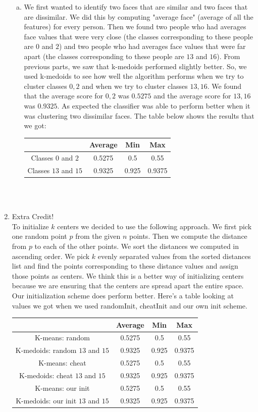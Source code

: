 \documentclass[11pt]{article}
\begin{document}
\begin{enumerate}[1]
\begin{enumerate}[(a)]
\item We first wanted to identify two faces that are similar and two faces that are dissimilar. We did this by computing "average face" (average of all the features) for every person. Then we found two people who had averages face values that were very close (the classes corresponding to these people are $0$ and $2$) and two people who had averages face values that were far apart (the classes corresponding to these people are $13$ and $16$). From previous parts, we saw that k-medoids performed slightly better. So, we used k-medoids to see how well the algorithm performs when we try to cluster classes $0,2$ and when we try to cluster classes $13,16$. We found that the average score for $0,2$ was $0.5275$ and the average score for $13, 16$ was $0.9325$. As expected the classifier was able to perform better when it was clustering two dissimilar faces.  The table below shows the results that we got: \\
 \begin{tabular}{| c | c | c | c |}
  \hline		
   & Average & Min & Max \\
  \hline
  Classes $0$ and $2$ & 0.5275 & 0.5 & 0.55 \\
  Classes $13$ and $15$ & 0.9325 & 0.925 & 0.9375   \\
  \hline
\end{tabular}\\ \\
\end{enumerate}
\item Extra Credit! \\
To initialize $k$ centers we decided to use the following approach. We first pick one random point $p$ from the given $n$ points. Then we compute the distance from $p$ to each of the other points. We sort the distances we computed in ascending order. We pick $k$ evenly separated values from the sorted distances list and find the points corresponding to these distance values and assign those points as centers. We think this is a better way of initializing centers because we are ensuring that the centers are spread apart the entire space. \\
Our initialization scheme does perform better. Here's a table looking at values we got when we used randomInit, cheatInit and our own init scheme. \\
 \begin{tabular}{| c | c | c | c |}
  \hline		
   & Average & Min & Max \\
  \hline
  K-means: random & 0.5275 & 0.5 & 0.55 \\
  K-medoids: random $13$ and $15$ & 0.9325 & 0.925 & 0.9375   \\
K-means: cheat & 0.5275 & 0.5 & 0.55 \\
  K-medoids: cheat $13$ and $15$ & 0.9325 & 0.925 & 0.9375   \\
K-means: our init & 0.5275 & 0.5 & 0.55 \\
  K-medoids: our init $13$ and $15$ & 0.9325 & 0.925 & 0.9375   \\
  \hline
\end{tabular}

 \end{enumerate}
\end{document}
